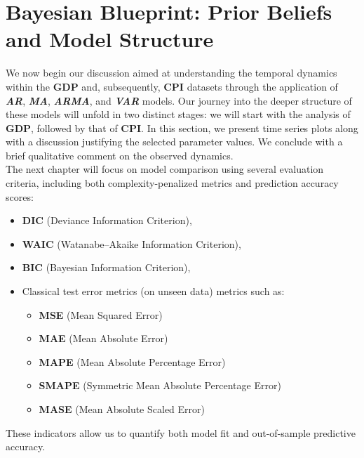 \documentclass{Configuration_Files/PoliMi3i_thesis}
\begin{document}
\chapter{Bayesian Blueprint: Prior Beliefs and Model Structure}
We now begin our discussion aimed at understanding the temporal dynamics within the \textbf{GDP} and, subsequently, \textbf{CPI} datasets through the application of \textbf{\textit{AR}}, \textbf{\textit{MA}}, \textbf{\textit{ARMA}}, and \textbf{\textit{VAR}} models. Our journey into the deeper structure of these models will unfold in two distinct stages: we will start with the analysis of \textbf{GDP}, followed by that of \textbf{CPI}.
In this section, we present time series plots along with a discussion justifying the selected parameter values. We conclude with a brief qualitative comment on the observed dynamics.\\

The next chapter will focus on model comparison using several evaluation criteria, including both complexity-penalized metrics and prediction accuracy scores:
\begin{itemize}
    \item \textbf{DIC} (Deviance Information Criterion),
    \item \textbf{WAIC} (Watanabe–Akaike Information Criterion),
    \item \textbf{BIC} (Bayesian Information Criterion),
    \item Classical test error metrics (on unseen data) metrics such as:
    \begin{itemize}
  \item \textbf{MSE} (Mean Squared Error)
  \item \textbf{MAE} (Mean Absolute Error)
  \item \textbf{MAPE} (Mean Absolute Percentage Error)
  \item \textbf{SMAPE} (Symmetric Mean Absolute Percentage Error)
  \item \textbf{MASE} (Mean Absolute Scaled Error)
    \end{itemize}
\end{itemize}
These indicators allow us to quantify both model fit and out-of-sample predictive accuracy.
\end{document}
